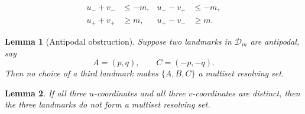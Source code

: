 \documentclass[10pt,a4paper]{amsart}
\newtheorem{lemma}{Lemma}
\newcommand{\D}{\mathcal D}
\begin{document}
\begin{equation}
\begin{aligned}
 u_-+v_-&\le -m, &
 u_- -v_+&\le -m,\\
 u_++v_+&\ge m, &
 u_+-v_-&\ge m.
\end{aligned}
\end{equation}

\begin{lemma}[Antipodal obstruction]\label{lem:antipodal}
Suppose two landmarks in $\D_m$ are antipodal, say
\[
 A=(p,q),
 \qquad
 C=(-p,-q).
\]
Then no choice of a third landmark makes $\{A,B,C\}$ a multiset resolving set.
\end{lemma}

\begin{lemma}\label{lem:distinct}
If all three $u$-coordinates and all three $v$-coordinates are distinct, then the three landmarks do not form a multiset resolving set.
\end{lemma}
\end{document}
